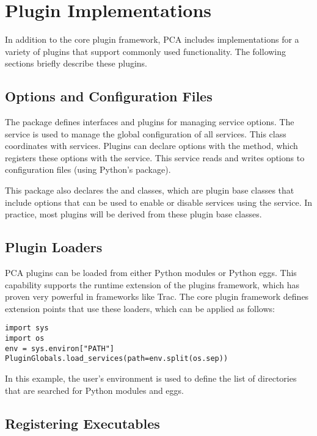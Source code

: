 \section{Plugin Implementations}

In addition to the core plugin framework, PCA includes implementations
for a variety of plugins that support commonly used functionality. The
following sections briefly describe these plugins.

\subsection{Options and Configuration Files}

The  package defines interfaces and plugins
for managing service options. The  service is used to manage
the global configuration of all services. This class coordinates with
 services. Plugins can declare options with the 
method, which registers these options with the  service. This
service reads and writes options to configuration files (using Python's
 package).

This package also declares the  and 
classes, which are plugin base classes that include options that can be
used to enable or disable services using the  service. In
practice, most plugins will be derived from these plugin base classes.

\subsection{Plugin Loaders}

PCA plugins can be loaded from either Python modules or Python eggs. This
capability supports the runtime extension of the plugins framework,
which has proven very powerful in frameworks like Trac. The core plugin
framework defines extension points that use these loaders, which can be
applied as follows:
\begin{lstlisting}
import sys
import os
env = sys.environ["PATH"]
PluginGlobals.load_services(path=env.split(os.sep))
\end{lstlisting}
In this example, the user's  environment is used to define the list
of directories that are searched for Python modules and eggs.

\subsection{Registering Executables}

